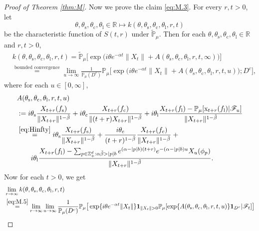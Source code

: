 \documentclass[12pt,a4paper]{amsart}
\theoremstyle{plain}
\theoremstyle{definition}
\numberwithin{equation}{section}
\begin{document}
\begin{proof}[Proof of Theorem \ref{thm:M}]
Now we prove the claim \eqref{eq:M.3}.
For every $r,t >0$, let
\[
\theta,\theta_\mathrm s,\theta_\mathrm c,\theta_\mathrm l\in \mathbb R \mapsto k(\theta,\theta_\mathrm s,\theta_\mathrm c,\theta_\mathrm l,r,t)
\]
be the characteristic function of  $S(t,r)$ under $\widetilde{\mathbb P}_{\mu}$.
Then for each $\theta,\theta_\mathrm s,\theta_\mathrm c,\theta_\mathrm l\in \mathbb R$ and $r,t> 0$,
\begin{align}
&k(\theta,\theta_\mathrm s,\theta_\mathrm c,\theta_\mathrm l,r,t)
=\widetilde{\mathbb P}_{\mu}\big[\exp\big( i\theta e^{-\alpha t}\|X_t\|+A(\theta_\mathrm s,\theta_\mathrm c,\theta_\mathrm l,r,t,\infty)\big)\big]\\
&\label{eq:M.5}\overset{\text{bounded convergence}}=\lim_{u\rightarrow \infty}\frac{1}{\mathbb P_{\mu}(D^c)}\mathbb P_{\mu}\big[\exp\big( i\theta e^{-\alpha t}\|X_t\|+A(\theta_\mathrm s,\theta_\mathrm c,\theta_\mathrm l,r,t,u)\big);D^c\big],
\end{align}
where for each $u\in [0,\infty]$,
\begin{align}
&A(\theta_\mathrm s,\theta_\mathrm c,\theta_\mathrm l,r,t,u)
\\&:=i\theta_\mathrm s \frac{X_{t+r}(f_\mathrm s)}{\|X_{t+r}\|^{1-\tilde{\beta}}} + i\theta_\mathrm c \frac{X_{t+r}(f_\mathrm c)}{\|(t+r)X_{t+r}\|^{1-\tilde{\beta}}} + i\theta_\mathrm l  \frac{ X_{t+r}(f_\mathrm l)- \mathbb P_\mu[\mathrm x_{t+r}(f_\mathrm l)|\mathscr F_u]}{\|X_{t+r}\|^{1-\tilde{\beta}}}
\\&\label{eq:M.6}\begin{multlined}
\overset{\eqref{eq:Hinfty}}=i\theta_\mathrm s \frac{X_{t+r}(f_\mathrm s)}{\|X_{t+r}\|^{1-\tilde{\beta}}} + \frac{i\theta_\mathrm c}{(t+r)^{1-\tilde{\beta}}} \frac{X_{t+r}(f_\mathrm c)}{\|X_{t+r}\|^{1-\tilde{\beta}}} + {}
\\\quad  i\theta_\mathrm l  \frac{ X_{t+r}(f_\mathrm l) - \sum_{p\in \mathbb Z_+^d:\alpha\tilde{\beta}>|p|b} e^{(\alpha - |p|b)(t+r)} e^{-(\alpha - |p|b)u}X_u(\phi_p) }{\|X_{t+r}\|^{1-\tilde{\beta}}}.
\end{multlined}
\end{align}
Now for each $t>0$, we get
\begin{align}
& \lim_{r\to \infty}k(\theta,\theta_\mathrm s,\theta_\mathrm c,\theta_\mathrm l,r,t)
\\&\overset{\eqref{eq:M.5}}=\lim_{r\to \infty}\lim_{u\rightarrow \infty}\frac{1}{\mathbb P_{\mu}(D^c)}\mathbb P_{\mu}\big[\exp\{i\theta e^{-\alpha t}\|X_t\|\} \mathbf 1_{\|X_t\|>0} \mathbb P_{\mu}[\exp\{A(\theta_\mathrm s,\theta_\mathrm c,\theta_\mathrm l,r,t,u)\}\mathbf 1_{D^c}|\mathscr F_t]\big]

\end{align}
\end{proof}
\end{document}
